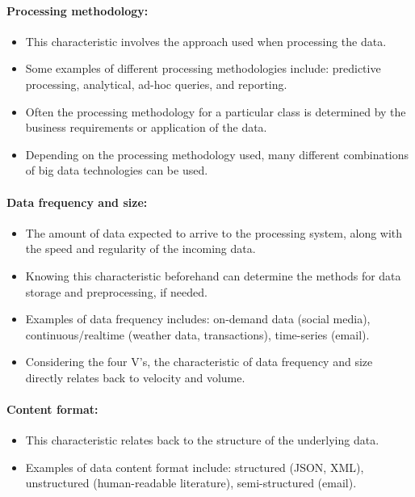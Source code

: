 \documentclass[a4paper,11pt]{article}
\begin{document}
\paragraph{Processing methodology:}

\begin{itemize}
  \item This characteristic involves the approach used when processing the data.
  \item Some examples of different processing methodologies include: predictive processing, analytical, ad-hoc queries,
  and reporting.
  \item Often the processing methodology for a particular class is determined by the business requirements or application
  of the data.
  \item Depending on the processing methodology used, many different combinations of big data technologies can be used.
\end{itemize}

\paragraph{Data frequency and size:}

\begin{itemize}
  \item The amount of data expected to arrive to the processing system, along with the speed and regularity of the incoming data.
  \item Knowing this characteristic beforehand can determine the methods for data storage and preprocessing, if needed.
  \item Examples of data frequency includes: on-demand data (social media), continuous/realtime (weather data, transactions),
  time-series (email).
  \item Considering the four V's, the characteristic of data frequency and size directly relates back to velocity and volume.
\end{itemize}

\paragraph{Content format:}

\begin{itemize}
  \item This characteristic relates back to the structure of the underlying data.
  \item Examples of data content format include: structured (JSON, XML), unstructured (human-readable literature),
  semi-structured (email).
\end{itemize}
\end{document}
